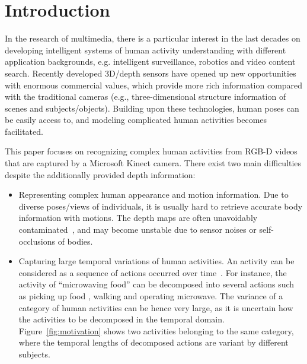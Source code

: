 \documentclass{sig-alternate}
\begin{document}
\vspace{-3mm}

\vspace{-3mm}
\section{Introduction}

In the research of multimedia, there is a particular interest in the last decades on developing intelligent systems of human activity understanding with different application backgrounds, e.g. intelligent surveillance, robotics and video content search. Recently developed 3D/depth sensors have opened up new opportunities with enormous commercial values, which provide more rich information compared with the traditional cameras (e.g., three-dimensional structure information of scenes and subjects/objects). Building upon these technologies, human poses can be easily access to, and modeling complicated human activities becomes facilitated.

This paper focuses on recognizing complex human activities from RGB-D videos that are captured by a Microsoft Kinect camera. There exist two main difficulties despite the additionally provided depth information:

\begin{itemize}
    \item Representing complex human appearance and motion information. Due to diverse poses/views of individuals, it is usually hard to retrieve accurate body information with motions. The depth maps are often unavoidably contaminated~\cite{HON4D}, and may become unstable due to sensor noises or self-occlusions of bodies.

    \item Capturing large temporal variations of human activities. An activity can be considered as a sequence of actions occurred over time~\cite{CIVU2013survey}. For instance, the activity of ``microwaving food'' can be decomposed into several actions such as picking up food , walking and operating microwave. The variance of a category of human activities can be hence very large, as it is uncertain how the activities to be decomposed in the temporal domain. Figure~\ref{fig:motivation} shows two activities belonging to the same category, where the temporal lengths of decomposed actions are variant by different subjects.
\end{itemize}
\end{document}
